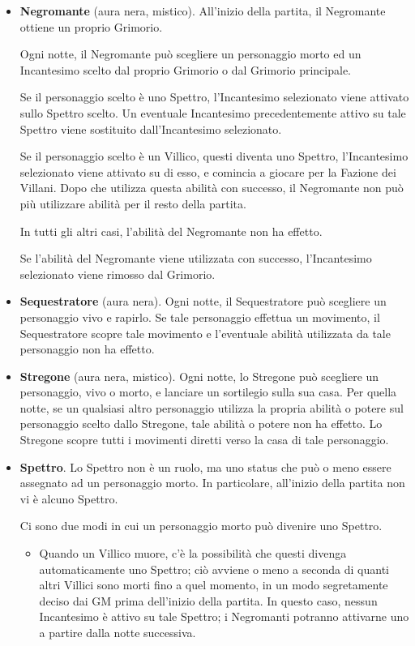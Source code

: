 \documentclass[a4paper,10pt]{article}
\begin{document}
\begin{itemize}
	\item {\bf Negromante} (aura nera, mistico). All'inizio della partita, il Negromante ottiene un proprio Grimorio.

	      Ogni notte, il Negromante può scegliere un personaggio morto ed un Incantesimo scelto dal proprio Grimorio o dal Grimorio principale.

	      Se il personaggio scelto è uno Spettro, l'Incantesimo selezionato viene attivato sullo Spettro scelto. Un eventuale Incantesimo precedentemente attivo su tale Spettro viene sostituito dall'Incantesimo selezionato. %

	      Se il personaggio scelto è un Villico, questi diventa uno Spettro, l'Incantesimo selezionato viene attivato su di esso, e comincia a giocare per la Fazione dei Villani. Dopo che utilizza questa abilità con successo, il Negromante non può più utilizzare abilità per il resto della partita.

	      In tutti gli altri casi, l'abilità del Negromante non ha effetto.

	      Se l'abilità del Negromante viene utilizzata con successo, l'Incantesimo selezionato viene rimosso dal Grimorio.

	\item {\bf Sequestratore} (aura nera). Ogni notte, il Sequestratore può scegliere un personaggio vivo e rapirlo. Se tale personaggio effettua un movimento, il Sequestratore scopre tale movimento e l'eventuale abilità utilizzata da tale personaggio non ha effetto.

	\item {\bf Stregone} (aura nera, mistico). Ogni notte, lo Stregone può scegliere un personaggio, vivo o morto, e lanciare un sortilegio sulla sua casa. Per quella notte, se un qualsiasi altro personaggio utilizza la propria abilità o potere sul personaggio scelto dallo Stregone, tale abilità o potere non ha effetto. Lo Stregone scopre tutti i movimenti diretti verso la casa di tale personaggio.

	\item {\bf Spettro}. Lo Spettro non è un ruolo, ma uno status che può o meno essere assegnato ad un personaggio morto. In particolare, all'inizio della partita non vi è alcuno Spettro.

	      Ci sono due modi in cui un personaggio morto può divenire uno Spettro.

	      \begin{itemize}
		      \item Quando un Villico muore, c'è la possibilità che questi divenga automaticamente uno Spettro; ciò avviene o meno a seconda di quanti altri Villici sono morti fino a quel momento, in un modo segretamente deciso dai GM prima dell'inizio della partita. In questo caso, nessun Incantesimo è attivo su tale Spettro; i Negromanti potranno attivarne uno a partire dalla notte successiva.


\end{itemize}
\end{itemize}
\end{document}
